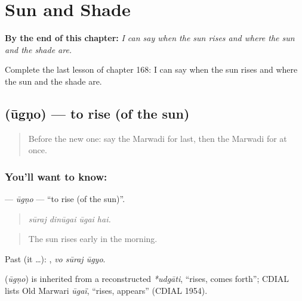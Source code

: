 
\chapter{Sun and Shade}
\label{ch:mw-sun-and-shade}

\begin{chapteropening}
\textbf{By the end of this chapter:} \emph{I can say when the sun rises and where the sun and the shade are.}

Complete the last lesson of chapter 168: I can say when the sun rises and where the sun and the shade are.
\end{chapteropening}

\section[\texorpdfstring{\mw{ऊगणो} (ūgṇo)}{ऊगणो (ūgṇo)}]{ (ūgṇo) — to rise (of the sun)}

\label{lesson:MW-C168-ugno}



\begin{quote}
Before the new one: say the Marwadi for last, then the Marwadi for at once.
\end{quote}

\subsection*{You'll want to know: }
\textbf{} — \emph{ūgṇo} — \textquotedblleft{}to rise (of the sun)\textquotedblright{}.

\begin{quote}
   
\end{quote}

\begin{quote}
\emph{sūraj dinūgai ūgai hai.}
\end{quote}

\begin{quote}
The sun rises early in the morning.
\end{quote}

Past (it …):   , \emph{vo sūraj ūgyo}.

\begin{cousinweb}
\textbf{} (\emph{ūgṇo}) is inherited from a reconstructed \emph{*udgāti}, \textquotedblleft{}rises, comes forth\textquotedblright{}; CDIAL lists Old Marwari \emph{ūgaï}, \textquotedblleft{}rises, appears\textquotedblright{} (CDIAL 1954).
\end{cousinweb}

